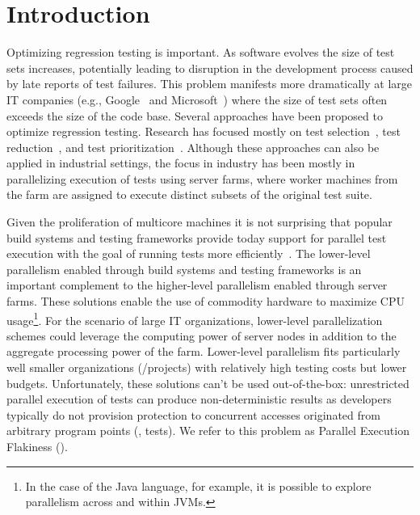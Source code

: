 \section{Introduction}

Optimizing regression testing is important.  As software evolves the
size of test sets increases, potentially leading to disruption in the
development process caused by late reports of test failures.  This
problem manifests more dramatically at large IT companies
(e.g., Google~ and
Microsoft~) where the size of test sets often exceeds the
size of the code base.  Several approaches have been proposed to
optimize regression testing.  Research has focused mostly on test
selection~, test reduction~, and test
prioritization~.  Although these approaches can also be
applied in industrial settings, the focus in industry has been mostly
in parallelizing execution of tests using server farms, where worker
machines from the farm are assigned to execute distinct subsets of the
original test suite.

Given the proliferation of multicore machines it is not surprising
that popular build systems and testing frameworks provide today
support for parallel test execution with the goal of running tests
more efficiently~\cite{junit-org,testng,nunit,maven-surefire-plugin}.
The lower-level parallelism enabled through build systems and testing
frameworks is an important complement to the higher-level parallelism
enabled through server farms.  These solutions enable the use of
commodity hardware to maximize CPU usage\footnote{In the case of the
  Java language, for example, it is possible to explore parallelism
  across and within JVMs.}.  For the scenario of large IT
organizations, lower-level parallelization schemes could leverage the
computing power of server nodes in addition to the aggregate
processing power of the farm.  Lower-level parallelism fits
particularly well smaller organizations (/projects) with relatively
high testing costs but lower budgets.  Unfortunately, these solutions
can't be used out-of-the-box: unrestricted parallel execution of tests
can produce non-deterministic results as developers typically do not
provision protection to concurrent accesses originated from arbitrary
program points (\ie{}, tests).  We refer to this problem as Parallel
Execution Flakiness (\pef{}).

